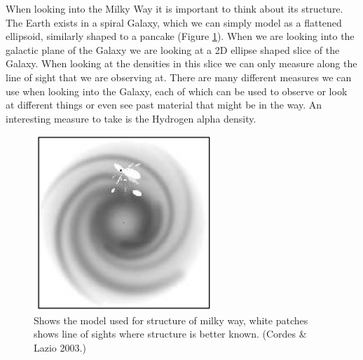 \documentclass[10pt,a4paper]{article}
\begin{document}
When looking into the Milky Way it is important to think about its structure. The Earth exists in a spiral Galaxy, which we can simply model as a flattened ellipsoid, similarly shaped to a pancake (Figure \ref{MWS}). When we are looking into the galactic plane of the Galaxy we are looking at a 2D ellipse shaped slice of the Galaxy. When looking at the densities in this slice we can only measure along the line of sight that we are observing at. There are many different measures we can use when looking into the Galaxy, each of which can be used to observe or look at different things or even see past material that might be in the way. An interesting measure to take is the Hydrogen alpha density.\\
\begin{figure}[H]
\begin{center}
	\includegraphics[width=0.6\textwidth]{MWS}
	\caption{Shows the model used for structure of milky way, white patches shows line of sights where structure is better known. (Cordes \& Lazio 2003.)}
	\label{MWS}
\end{center}
\end{figure}
\end{document}
